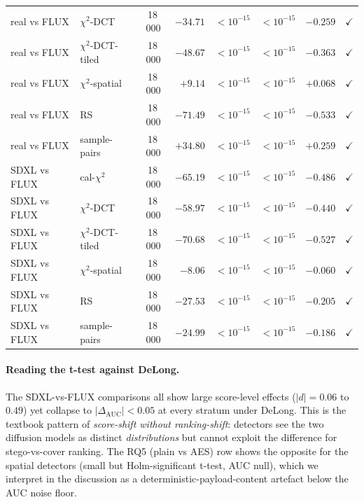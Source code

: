 \documentclass[10pt,twocolumn,a4paper]{article}
\begin{document}
\begin{table}[h]
\begin{tabular}{@{}l l c r r r r r@{}}
real vs FLUX   & $\chi^2$-DCT       & 18\,000 & $-34.71$ & $<\!10^{-15}$ & $<\!10^{-15}$ & $-0.259$ & $\checkmark$ \\
real vs FLUX   & $\chi^2$-DCT-tiled & 18\,000 & $-48.67$ & $<\!10^{-15}$ & $<\!10^{-15}$ & $-0.363$ & $\checkmark$ \\
real vs FLUX   & $\chi^2$-spatial   & 18\,000 & $+9.14$  & $<\!10^{-15}$ & $<\!10^{-15}$ & $+0.068$ & $\checkmark$ \\
real vs FLUX   & RS                 & 18\,000 & $-71.49$ & $<\!10^{-15}$ & $<\!10^{-15}$ & $-0.533$ & $\checkmark$ \\
real vs FLUX   & sample-pairs       & 18\,000 & $+34.80$ & $<\!10^{-15}$ & $<\!10^{-15}$ & $+0.259$ & $\checkmark$ \\
\midrule
SDXL vs FLUX   & cal-$\chi^2$       & 18\,000 & $-65.19$ & $<\!10^{-15}$ & $<\!10^{-15}$ & $-0.486$ & $\checkmark$ \\
SDXL vs FLUX   & $\chi^2$-DCT       & 18\,000 & $-58.97$ & $<\!10^{-15}$ & $<\!10^{-15}$ & $-0.440$ & $\checkmark$ \\
SDXL vs FLUX   & $\chi^2$-DCT-tiled & 18\,000 & $-70.68$ & $<\!10^{-15}$ & $<\!10^{-15}$ & $-0.527$ & $\checkmark$ \\
SDXL vs FLUX   & $\chi^2$-spatial   & 18\,000 & $-8.06$  & $<\!10^{-15}$ & $<\!10^{-15}$ & $-0.060$ & $\checkmark$ \\
SDXL vs FLUX   & RS                 & 18\,000 & $-27.53$ & $<\!10^{-15}$ & $<\!10^{-15}$ & $-0.205$ & $\checkmark$ \\
SDXL vs FLUX   & sample-pairs       & 18\,000 & $-24.99$ & $<\!10^{-15}$ & $<\!10^{-15}$ & $-0.186$ & $\checkmark$ \\
\bottomrule
\end{tabular}
\end{table}

\paragraph{Reading the t-test against DeLong.} The SDXL-vs-FLUX comparisons all show large score-level effects ($|d|\!=\!0.06$ to $0.49$) yet collapse to $|\Delta_\text{AUC}|\!<\!0.05$ at every stratum under DeLong. This is the textbook pattern of \emph{score-shift without ranking-shift}: detectors see the two diffusion models as distinct \emph{distributions} but cannot exploit the difference for stego-vs-cover ranking. The RQ5 (plain vs AES) row shows the opposite for the spatial detectors (small but Holm-significant t-test, AUC null), which we interpret in the discussion as a deterministic-payload-content artefact below the AUC noise floor.
\end{document}
